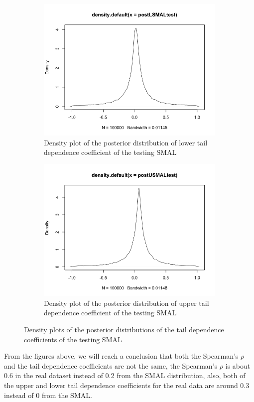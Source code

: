 \documentclass[mstat,12pt]{unswthesis}  %
\numberwithin{equation}{section}
\begin{document}
\begin{figure}[H]
\centering
\begin{subfigure}{.42\textwidth}
  \centering
  \includegraphics[width=\linewidth]{postLSMALtest.png}  
  \caption{Density plot of the posterior distribution of lower tail dependence coefficient of the testing SMAL}
  \label{fig:sub-first}
\end{subfigure}
\begin{subfigure}{.42\textwidth}
  \centering
  \includegraphics[width=\linewidth]{postUSMALtest.png}  
  \caption{Density plot of the posterior distribution of upper tail dependence coefficient of the testing SMAL}
  \label{fig:sub-second}
\end{subfigure}
\caption{Density plots of the posterior distributions of the tail dependence coefficients of the testing SMAL}
\end{figure}
\newpage
From the figures above, we will reach a conclusion that both the Spearman's $\rho$ and the tail dependence coefficients are not the same, the Spearman's $\rho$ is about 0.6 in the real dataset instead of 0.2 from the SMAL distribution, also, both of the upper and lower tail dependence coefficients for the real data are around 0.3 instead of 0 from the SMAL.
\end{document}
